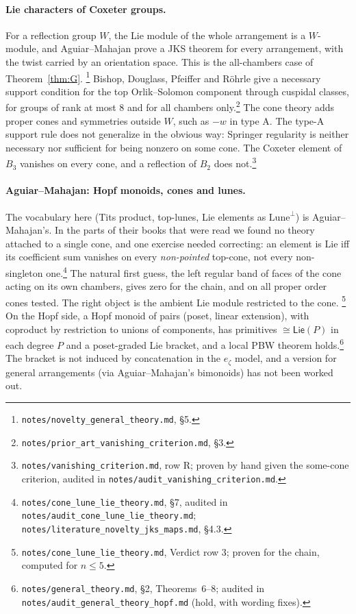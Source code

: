 \documentclass[11pt]{article}
\theoremstyle{definition}
\theoremstyle{remark}
\newcommand{\PLie}{\mathsf{Lie}}
\newcommand{\Lune}{\mathrm{Lune}}
\newcommand{\src}[1]{\nolinkurl{#1}}
\newcommand{\tagbox}[1]{\leavevmode\marginpar{\raggedright\fbox{\parbox{0.66in}{\centering\scriptsize\sffamily #1}}}}
\newcommand{\PROVEN}{\tagbox{PROVEN\\AUDITED}}
\newcommand{\COMPUTED}{\tagbox{COMPUTED}}
\begin{document}
\paragraph{Lie characters of Coxeter groups.} For a reflection group $W$,
the Lie module of the whole arrangement is a $W$-module, and Aguiar--Mahajan
prove a JKS theorem for every arrangement, with the twist carried by an
orientation space. This is the all-chambers case of Theorem~\ref{thm:G}.%
\footnote{\src{notes/novelty_general_theory.md}, \S5.} Bishop, Douglass,
Pfeiffer and R\"ohrle give a necessary support condition for the top
Orlik--Solomon component through cuspidal classes, for groups of rank at
most $8$ and for all chambers only.\footnote{%
\src{notes/prior_art_vanishing_criterion.md}, \S3.} The cone theory
adds proper cones and symmetries outside $W$, such as $-w$ in type A. The
type-A support rule does not generalize in the obvious way: Springer
regularity is neither necessary nor sufficient for being nonzero on some
cone. The Coxeter element of $B_3$ vanishes on every cone, and a reflection
of $B_2$ does not.\footnote{\src{notes/vanishing_criterion.md}, row R; proven
by hand given the some-cone criterion, audited in
\src{notes/audit_vanishing_criterion.md}.}\PROVEN

\paragraph{Aguiar--Mahajan: Hopf monoids, cones and lunes.} The vocabulary
here (Tits product, top-lunes, Lie elements as $\Lune^\perp$) is
Aguiar--Mahajan's. In the parts of their books that were read we found no
theory attached to a single cone, and one exercise needed correcting: an element is Lie iff its coefficient sum
vanishes on every \emph{non-pointed} top-cone, not every non-singleton
one.\footnote{\src{notes/cone_lune_lie_theory.md}, \S7, audited in
\src{notes/audit_cone_lune_lie_theory.md};
\src{notes/literature_novelty_jks_maps.md}, \S4.3.}\PROVEN{} The natural
first guess, the left regular band of faces of the cone acting on its own
chambers, gives zero for the chain, and on all proper order cones tested.
The right object is the ambient Lie module restricted to the cone.%
\footnote{\src{notes/cone_lune_lie_theory.md}, Verdict row 3; proven for the
chain, computed for $n\le5$.}\COMPUTED{} On the Hopf side, a Hopf monoid of
pairs (poset, linear extension), with coproduct by restriction to unions of
components, has primitives $\cong\PLie(P)$ in each degree $P$ and a
poset-graded Lie bracket, and a local PBW theorem holds.\footnote{%
\src{notes/general_theory.md}, \S2, Theorems~6--8; audited in
\src{notes/audit_general_theory_hopf.md} (hold, with wording fixes).}%
\PROVEN{} The bracket is not induced by concatenation in the
$e_\zeta$ model, and a version for general arrangements (via
Aguiar--Mahajan's bimonoids) has not been worked out.
\end{document}
